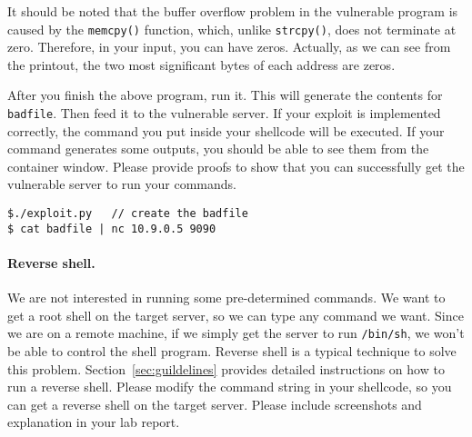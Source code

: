 \ifdefined\arm
It should be noted that the buffer overflow problem in the 
vulnerable program is caused by the \texttt{memcpy()} function, 
which, unlike
\texttt{strcpy()}, does not terminate at zero. Therefore,
in your input, you can have zeros.  Actually, as we can
see from the printout, the two most significant 
bytes of each address are zeros. 
\fi


After you finish the above program, run it. This will generate
the contents for \texttt{badfile}. Then feed it to
the vulnerable server. If your exploit is implemented correctly, the 
command you put inside your shellcode will be executed. If your 
command generates some outputs, you should be able to see
them from the container window. Please provide proofs to show that you
can successfully get the vulnerable server to run 
your commands.

\begin{lstlisting}
$./exploit.py   // create the badfile
$ cat badfile | nc 10.9.0.5 9090
\end{lstlisting}
 

\paragraph{Reverse shell.}
We are not interested in running some pre-determined commands. We 
want to get a root shell on the target server, so we can 
type any command we want. Since we are on a remote machine,
if we simply get the server to run \texttt{/bin/sh}, we won't be able to
control the shell program. Reverse shell is a typical
technique to solve this problem. Section~\ref{sec:guildelines} provides 
detailed instructions on how to run a reverse shell.
Please modify the command string in your shellcode, so you can
get a reverse shell on the target server. 
Please include screenshots and explanation in your lab report.



